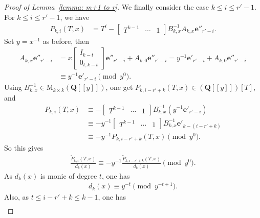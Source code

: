 \documentclass[10pt,a4paper]{amsart}
\newcommand{\M}{\mathrm{M}}
\newcommand{\Q}{\mathbf{Q}}
\begin{document}
\begin{proof}[Proof of Lemma~\ref{lemma: m+1 to r}]
We finally consider the case $k\leq i\leq r'-1$. For $k\leq i\leq r'-1$, we have
    \begin{align*}
        P_{k,i}(T,x)
        &=
        T^i
        -
        \begin{bmatrix}
            T^{k-1} & \cdots & 1
        \end{bmatrix}
        B_{k,x}^{-1}A_{k,x}
        \mathbf{e}''_{r'-i}.
    \end{align*}
Set $y=x^{-1}$ as before, then
    \begin{align*}
        A_{k,x}\mathbf{e}''_{r'-i}
        &=
        x
        \begin{bmatrix}
           I_{k-t} \\
           0_{t,k-t}
        \end{bmatrix}
        \mathbf{e}''_{r'-i}
        +
        A_{k,0}\mathbf{e}''_{r'-i}
        =
        y^{-1}\mathbf{e}'_{r'-i}
        +A_{k,0}\mathbf{e}''_{r'-i}
        \\
        &\equiv
        y^{-1}\mathbf{e}'_{r'-i}
        \pmod{y^0}.
    \end{align*}
Using $B_{k,x}^{-1}\in \M_{k\times k}(\Q[[y]])$, one get $P_{k,i-r'+k}(T,x)\in (\Q[[y]])[T]$, and
    \begin{align*}
        P_{k,i}(T,x)
        &\equiv
        -
        \begin{bmatrix}
            T^{k-1} & \cdots & 1
        \end{bmatrix}
        B_{k,x}^{-1}(y^{-1}\mathbf{e}'_{r'-i})
        \\
        &\equiv
        -y^{-1}
        \begin{bmatrix}
            T^{k-1} & \cdots & 1
        \end{bmatrix}
        B_{k,x}^{-1}\mathbf{e}'_{k-(i-r'+k)}
        \\
        &\equiv
        -y^{-1}P_{k,i-r'+k}(T,x)
        \pmod{y^0}.
    \end{align*}
So this gives
    \begin{align*}
        \frac{\tilde P_{k,i}(T,x)}{d_k(x)}
        \equiv
        -y^{-1}\frac{\tilde P_{k,i-r'+k}(T,x)}{d_k(x)}
        \pmod{y^0}.
    \end{align*}
As $d_k(x)$ is monic of degree $t$, one has
    \begin{align*}
        d_k(x)
        \equiv
        y^{-t} \pmod{y^{-t+1}}.
    \end{align*}
Also, as $t\leq i-r'+k\leq k-1$, one has
    \begin{align*}

\end{align*}
\end{proof}
\end{document}
